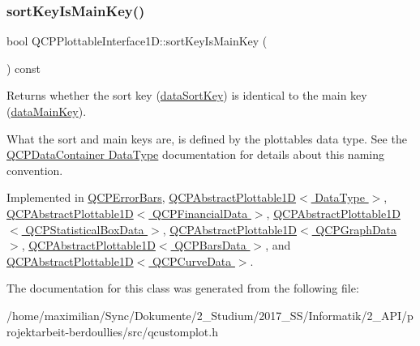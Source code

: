 \mbox{\label{class_q_c_p_plottable_interface1_d_a229e65e7ab968dd6cd0e259fa504b79d}} 
\subsubsection{\texorpdfstring{sort\+Key\+Is\+Main\+Key()}{sortKeyIsMainKey()}}
{\footnotesize\ttfamily bool Q\+C\+P\+Plottable\+Interface1\+D\+::sort\+Key\+Is\+Main\+Key (\begin{DoxyParamCaption}{ }\end{DoxyParamCaption}) const\hspace{0.3cm}{\ttfamily [pure virtual]}}

Returns whether the sort key (\hyperlink{class_q_c_p_plottable_interface1_d_afdc92f9f01e7e35f2e96b2ea9dc14ae7}{data\+Sort\+Key}) is identical to the main key (\hyperlink{class_q_c_p_plottable_interface1_d_a2bd60daaac046945fead558cbd83cf73}{data\+Main\+Key}).

What the sort and main keys are, is defined by the plottable\textquotesingle{}s data type. See the \hyperlink{class_q_c_p_data_container_qcpdatacontainer-datatype}{Q\+C\+P\+Data\+Container Data\+Type} documentation for details about this naming convention. 

Implemented in \hyperlink{class_q_c_p_error_bars_aa00fcef7b0cb5c54bafe32ab4b16e674}{Q\+C\+P\+Error\+Bars}, \hyperlink{class_q_c_p_abstract_plottable1_d_a022e8905f5a667d8379493d6a037e79f}{Q\+C\+P\+Abstract\+Plottable1\+D$<$ Data\+Type $>$}, \hyperlink{class_q_c_p_abstract_plottable1_d_a022e8905f5a667d8379493d6a037e79f}{Q\+C\+P\+Abstract\+Plottable1\+D$<$ Q\+C\+P\+Financial\+Data $>$}, \hyperlink{class_q_c_p_abstract_plottable1_d_a022e8905f5a667d8379493d6a037e79f}{Q\+C\+P\+Abstract\+Plottable1\+D$<$ Q\+C\+P\+Statistical\+Box\+Data $>$}, \hyperlink{class_q_c_p_abstract_plottable1_d_a022e8905f5a667d8379493d6a037e79f}{Q\+C\+P\+Abstract\+Plottable1\+D$<$ Q\+C\+P\+Graph\+Data $>$}, \hyperlink{class_q_c_p_abstract_plottable1_d_a022e8905f5a667d8379493d6a037e79f}{Q\+C\+P\+Abstract\+Plottable1\+D$<$ Q\+C\+P\+Bars\+Data $>$}, and \hyperlink{class_q_c_p_abstract_plottable1_d_a022e8905f5a667d8379493d6a037e79f}{Q\+C\+P\+Abstract\+Plottable1\+D$<$ Q\+C\+P\+Curve\+Data $>$}.



The documentation for this class was generated from the following file\+:\begin{DoxyCompactItemize}
\item 
/home/maximilian/\+Sync/\+Dokumente/2\+\_\+\+Studium/2017\+\_\+\+S\+S/\+Informatik/2\+\_\+\+A\+P\+I/projektarbeit-\/berdoullies/src/qcustomplot.\+h\end{DoxyCompactItemize}
